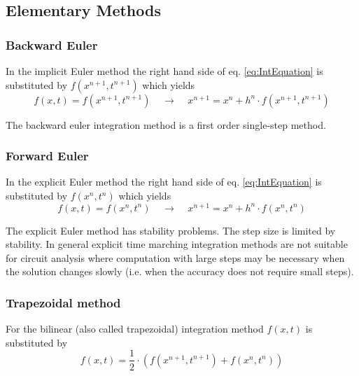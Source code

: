 \subsection{Elementary Methods}

\subsubsection{Backward Euler}

In the implicit Euler method the right hand side of
eq. \eqref{eq:IntEquation} is substituted by $f(x^{n+1}, t^{n+1})$
which yields
\begin{equation}
\label{eq:BEInt}
f(x,t) = f(x^{n+1}, t^{n+1})
\;\;\;\; \rightarrow \;\;\;\;
x^{n+1} = x^n + h^n\cdot f(x^{n+1}, t^{n+1})
\end{equation}

The backward euler integration method is a first order single-step
method.

\subsubsection{Forward Euler}

In the explicit Euler method the right hand side of
eq. \eqref{eq:IntEquation} is substituted by $f(x^{n}, t^{n})$ which
yields
\begin{equation}
f(x,t) = f(x^n, t^n)
\;\;\;\; \rightarrow \;\;\;\;
x^{n+1} = x^n + h^n\cdot f(x^n, t^n)
\end{equation}

The explicit Euler method has stability problems.  The step size is
limited by stability.  In general explicit time marching integration
methods are not suitable for circuit analysis where computation with
large steps may be necessary when the solution changes slowly
(i.e. when the accuracy does not require small steps).

\subsubsection{Trapezoidal method}

For the bilinear (also called trapezoidal) integration method $f(x,t)$
is substituted by
\begin{equation}
f(x,t) = \dfrac{1}{2}\cdot \left(f(x^{n+1}, t^{n+1}) + f(x^{n}, t^{n})\right)
\end{equation}

